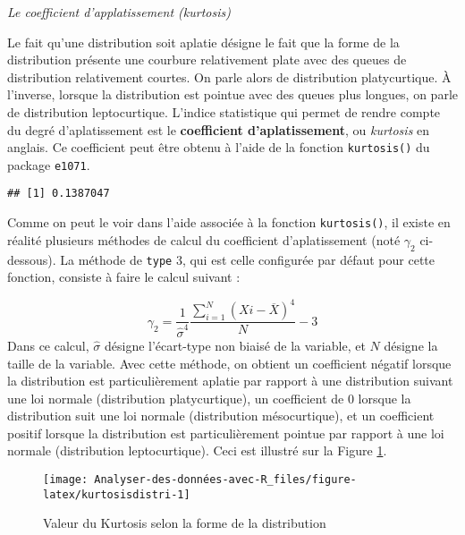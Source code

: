 \documentclass[
]{book}
\newenvironment{Shaded}{\begin{snugshade}}{\end{snugshade}}
\newcommand{\AttributeTok}[1]{\textcolor[rgb]{0.77,0.63,0.00}{#1}}
\newcommand{\DecValTok}[1]{\textcolor[rgb]{0.00,0.00,0.81}{#1}}
\newcommand{\FunctionTok}[1]{\textcolor[rgb]{0.00,0.00,0.00}{#1}}
\newcommand{\NormalTok}[1]{#1}
\newcommand{\SpecialCharTok}[1]{\textcolor[rgb]{0.00,0.00,0.00}{#1}}
\begin{document}
\emph{Le coefficient d'applatissement (kurtosis)}

Le fait qu'une distribution soit aplatie désigne le fait que la forme de la distribution présente une courbure relativement plate avec des queues de distribution relativement courtes. On parle alors de distribution platycurtique. À l'inverse, lorsque la distribution est pointue avec des queues plus longues, on parle de distribution leptocurtique. L'indice statistique qui permet de rendre compte du degré d'aplatissement est le \textbf{coefficient d'aplatissement}, ou \emph{kurtosis} en anglais. Ce coefficient peut être obtenu à l'aide de la fonction \texttt{kurtosis()} du package \texttt{e1071}.

\begin{Shaded}
\end{Shaded}

\begin{verbatim}
## [1] 0.1387047
\end{verbatim}

Comme on peut le voir dans l'aide associée à la fonction \texttt{kurtosis()}, il existe en réalité plusieurs méthodes de calcul du coefficient d'aplatissement (noté \(\gamma_{2}\) ci-dessous). La méthode de \texttt{type} 3, qui est celle configurée par défaut pour cette fonction, consiste à faire le calcul suivant :

\[\gamma_{2} =  \frac{1}{\hat{\sigma}^4} {\frac{\sum_{i=1}^{N} (X{i} - \overline{X})^4}{N}} -3\]
Dans ce calcul, \(\hat{\sigma}\) désigne l'écart-type non biaisé de la variable, et \(N\) désigne la taille de la variable. Avec cette méthode, on obtient un coefficient négatif lorsque la distribution est particulièrement aplatie par rapport à une distribution suivant une loi normale (distribution platycurtique), un coefficient de 0 lorsque la distribution suit une loi normale (distribution mésocurtique), et un coefficient positif lorsque la distribution est particulièrement pointue par rapport à une loi normale (distribution leptocurtique). Ceci est illustré sur la Figure \ref{fig:kurtosisdistri}.

\begin{figure}

{\centering \texttt{[image: Analyser-des-données-avec-R\_files/figure-latex/kurtosisdistri-1]} 

}

\caption{Valeur du Kurtosis selon la forme de la distribution}\label{fig:kurtosisdistri}
\end{figure}
\end{document}
